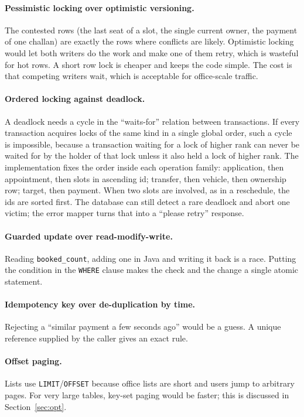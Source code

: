 \paragraph{Pessimistic locking over optimistic versioning.} The contested rows (the last
seat of a slot, the single current owner, the payment of one challan) are exactly the
rows where conflicts are likely. Optimistic locking would let both writers do the work
and make one of them retry, which is wasteful for hot rows. A short row lock is cheaper
and keeps the code simple. The cost is that competing writers wait, which is acceptable
for office-scale traffic.

\paragraph{Ordered locking against deadlock.} A deadlock needs a cycle in the
``waits-for'' relation between transactions. If every transaction acquires locks of the
same kind in a single global order, such a cycle is impossible, because a transaction
waiting for a lock of higher rank can never be waited for by the holder of that lock
unless it also held a lock of higher rank. The implementation fixes the order inside each
operation family: application, then appointment, then slots in ascending id; transfer,
then vehicle, then ownership row; target, then payment. When two slots are involved, as in
a reschedule, the ids are sorted first. The database can still detect a rare deadlock and
abort one victim; the error mapper turns that into a ``please retry'' response.

\paragraph{Guarded update over read-modify-write.} Reading \texttt{booked\_count},
adding one in Java and writing it back is a race. Putting the condition in the
\texttt{WHERE} clause makes the check and the change a single atomic statement.

\paragraph{Idempotency key over de-duplication by time.} Rejecting a ``similar payment a few
seconds ago'' would be a guess. A unique reference supplied by the caller gives an exact
rule.

\paragraph{Offset paging.} Lists use \texttt{LIMIT}/\texttt{OFFSET} because office lists are
short and users jump to arbitrary pages. For very large tables, key-set paging would be
faster; this is discussed in Section~\ref{sec:opt}.

